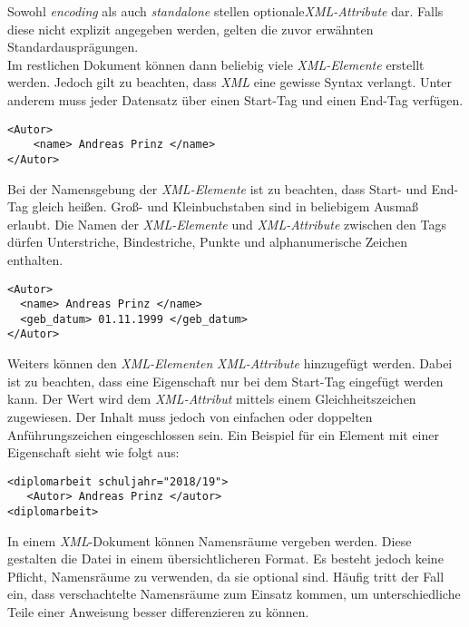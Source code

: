 \noindent
Sowohl \textit{encoding} als auch \textit{standalone} stellen optionale\textit{XML-Attribute} dar. Falls diese nicht explizit angegeben werden, gelten die zuvor erwähnten Standardausprägungen.\footnotemark[9]
\\

\noindent
Im restlichen Dokument können dann beliebig viele \textit{XML-Elemente} erstellt werden. Jedoch gilt zu beachten, dass \textit{XML} eine gewisse Syntax verlangt. Unter anderem muss jeder Datensatz über einen Start-Tag und einen End-Tag verfügen.\footnotemark[9]

\begin{verbatim}
<Autor>
    <name> Andreas Prinz </name>
</Autor>
\end{verbatim}

\noindent
Bei der Namensgebung der \textit{XML-Elemente} ist zu beachten, dass Start- und End-Tag gleich heißen. Groß- und Kleinbuchstaben sind in beliebigem Ausmaß erlaubt. Die Namen der \textit{XML-Elemente} und \textit{XML-Attribute} zwischen den Tags dürfen Unterstriche, Bindestriche, Punkte und alphanumerische Zeichen enthalten. \footnotemark[9]

\begin{verbatim}
<Autor>
  <name> Andreas Prinz </name>
  <geb_datum> 01.11.1999 </geb_datum>
</Autor>
\end{verbatim}

\noindent
Weiters können den \textit{XML-Elementen} \textit{XML-Attribute} hinzugefügt werden. Dabei ist zu beachten, dass eine Eigenschaft nur bei dem Start-Tag eingefügt werden kann. Der Wert wird dem \textit{XML-Attribut} mittels einem Gleichheitszeichen zugewiesen. Der Inhalt muss jedoch von einfachen oder doppelten Anführungszeichen eingeschlossen sein. Ein Beispiel für ein Element mit einer Eigenschaft sieht wie folgt aus:

\begin{verbatim}
<diplomarbeit schuljahr="2018/19">
   <Autor> Andreas Prinz </autor>
<diplomarbeit>
\end{verbatim}

\noindent
In einem \textit{XML}-Dokument können Namensräume vergeben werden. Diese gestalten die Datei in einem übersichtlicheren Format. Es besteht jedoch keine Pflicht, Namensräume zu verwenden, da sie optional sind. Häufig tritt der Fall ein, dass verschachtelte Namensräume zum Einsatz kommen, um unterschiedliche Teile einer Anweisung besser differenzieren zu können. 


